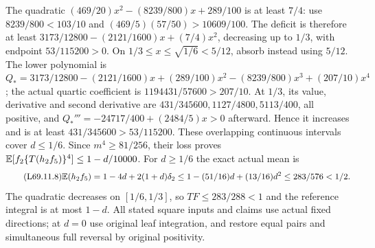 The quadratic $(469/20)x^2-(8239/800)x+289/100$ is at least $7/4$:
use $8239/800<103/10$ and $(469/5)(57/50)>10609/100$.
The deficit is therefore at least
$3173/12800-(2121/1600)x+(7/4)x^2$, decreasing up to $1/3$,
with endpoint $53/115200>0$.
On $1/3\le x\le\sqrt{1/6}<5/12$, absorb instead using $5/12$.
The lower polynomial is
$Q_*=3173/12800-(2121/1600)x+(289/100)x^2
-(8239/800)x^3+(207/10)x^4$;
the actual quartic coefficient is $1194431/57600>207/10$.
At $1/3$, its value, derivative and second derivative are
$431/345600,1127/4800,5113/400$, all positive, and
$Q_*'''=-24717/400+(2484/5)x>0$ afterward.
Hence it increases and is at least $431/345600>53/115200$.
These overlapping continuous intervals cover $d\le1/6$.
Since $m^4\ge81/256$, their loss proves
$\mathbb E[f_2\{T(h_2f_5)\}^4]\le1-d/10000$.
For $d\ge1/6$ the exact actual mean is
\begin{equation*}\tag{L69.11.8}
\mathbb E(h_2f_5)=1-4d+2(1+d)\delta_2
\le1-(51/16)d+(13/16)d^2\le283/576<1/2.\label{eq:L69:mean}
\end{equation*}
The quadratic decreases on $[1/6,1/3]$, so $TF\le283/288<1$ and
the reference integral is at most $1-d$.
All stated square inputs and claims use actual fixed directions;
at $d=0$ use original leaf integration, and restore equal pairs and
simultaneous full reversal by original positivity.
